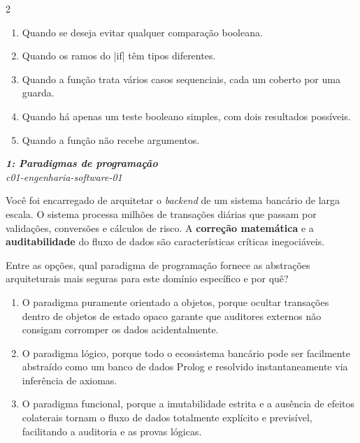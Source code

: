 \documentclass[a4paper,10pt,brazil]{article}
\begin{document}
\begin{multicols}{2}
\begin{enumerate}
  \item Quando se deseja evitar qualquer comparação booleana.

  \item Quando os ramos do \haskellinline|if| têm tipos diferentes.

  \item Quando a função trata vários casos sequenciais, cada um coberto por uma guarda.

  \item Quando há apenas um teste booleano simples, com dois resultados possíveis.

  \item Quando a função não recebe argumentos.


\end{enumerate}

\begin{flushright}
  \footnotesize
  \textit{\textbf{1: Paradigmas de programação}}\\
  \textit{c01-engenharia-software-01}\\

\end{flushright}
Você foi encarregado de arquitetar o \emph{backend} de um sistema bancário de larga escala. O sistema processa milhões de transações diárias que passam por validações, conversões e cálculos de risco. A \textbf{correção matemática} e a \textbf{auditabilidade} do fluxo de dados são características críticas inegociáveis.

Entre as opções, qual paradigma de programação fornece as abstrações arquiteturais mais seguras para este domínio específico e por quê?

\begin{enumerate}
  \item O paradigma puramente orientado a objetos, porque ocultar transações dentro de objetos de estado opaco garante que auditores externos não consigam corromper os dados acidentalmente.

  \item O paradigma lógico, porque todo o ecossistema bancário pode ser facilmente abstraído como um banco de dados Prolog e resolvido instantaneamente via inferência de axiomas.

  \item O paradigma funcional, porque a imutabilidade estrita e a ausência de efeitos colaterais tornam o fluxo de dados totalmente explícito e previsível, facilitando a auditoria e as provas lógicas.


\end{enumerate}
\end{multicols}
\end{document}

